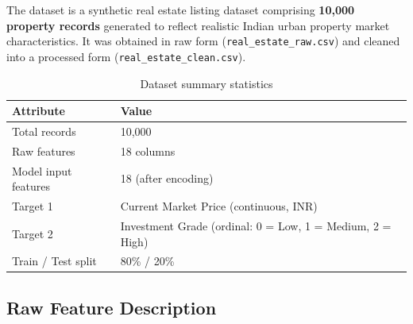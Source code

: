 \documentclass[12pt,a4paper]{article}
\begin{document}
The dataset is a synthetic real estate listing dataset comprising \textbf{10,000 property records} generated to reflect realistic Indian urban property market characteristics. It was obtained in raw form (\texttt{real\_estate\_raw.csv}) and cleaned into a processed form (\texttt{real\_estate\_clean.csv}).

\begin{table}[H]
\centering
\caption{Dataset summary statistics}
\renewcommand{\arraystretch}{1.25}
\begin{tabular}{ll}
\toprule
\textbf{Attribute} & \textbf{Value} \\
\midrule
Total records               & 10,000 \\
Raw features                & 18 columns \\
Model input features        & 18 (after encoding) \\
Target 1                    & Current Market Price (continuous, INR) \\
Target 2                    & Investment Grade (ordinal: 0 = Low, 1 = Medium, 2 = High) \\
Train / Test split          & 80\% / 20\% \\
\bottomrule
\end{tabular}
\end{table}

\subsection{Raw Feature Description}
\end{document}
